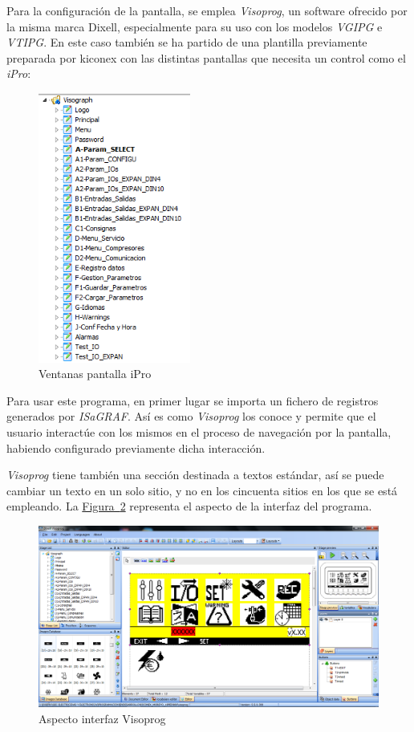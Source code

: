 Para la configuración de la pantalla, se emplea \textit{Visoprog}, un software ofrecido por la misma marca Dixell, especialmente para su uso con los modelos \textit{VGIPG} e \textit{VTIPG}. En este caso también se ha partido de una plantilla previamente preparada por kiconex con las distintas pantallas que necesita un control como el \textit{iPro}:

\begin{figure}[H]
  \centering
  \includegraphics[width=5cm, keepaspectratio]{img/ventanasVisoprog}
  \caption{Ventanas pantalla iPro}
  \label{figura:ventanasIpro}
\end{figure}

Para usar este programa, en primer lugar se importa un fichero de registros generados por \textit{ISaGRAF}. Así es como \textit{Visoprog} los conoce y permite que el usuario interactúe con los mismos en el proceso de navegación por la pantalla, habiendo configurado previamente dicha interacción.

\textit{Visoprog} tiene también una sección destinada a textos estándar, así se puede cambiar un texto en un solo sitio, y no en los cincuenta sitios en los que se está empleando. La \hyperref[figura:interfazVisoprog]{Figura~\ref{figura:interfazVisoprog}} representa el aspecto de la interfaz del programa.

\begin{figure}[H]
  \centering
  \includegraphics[width=\textwidth, keepaspectratio]{img/interfazVisoprog}
  \caption{Aspecto interfaz Visoprog}
  \label{figura:interfazVisoprog}
\end{figure}

